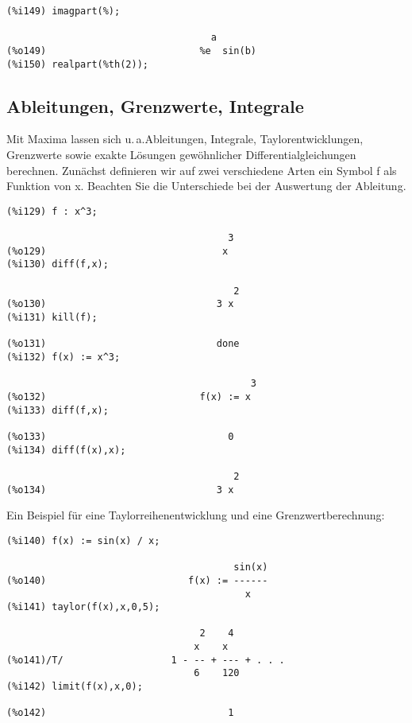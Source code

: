 \documentclass[ngerman,12pt]{scrartcl}
\newcommand*\ua{u.\,a.\xspace}
\begin{document}
\begin{verbatim}
(%i149) imagpart(%);

                                    a
(%o149)                           %e  sin(b)
(%i150) realpart(%th(2));
\end{verbatim}

\subsection{Ableitungen, Grenzwerte, Integrale}

Mit Maxima lassen sich \ua\@ Ableitungen, Integrale,
Taylorentwicklungen, Grenzwerte sowie exakte Lösungen gewöhnlicher
Differentialgleichungen berechnen.
Zunächst definieren wir auf zwei verschiedene Arten ein Symbol f als
Funktion von x. Beachten Sie die Unterschiede bei der Auswertung der
Ableitung.

\begin{verbatim}
(%i129) f : x^3;

                                       3
(%o129)                               x
(%i130) diff(f,x);

                                        2
(%o130)                              3 x
(%i131) kill(f);

(%o131)                              done
(%i132) f(x) := x^3;

                                           3
(%o132)                           f(x) := x
(%i133) diff(f,x);

(%o133)                                0
(%i134) diff(f(x),x);

                                        2
(%o134)                              3 x
\end{verbatim}

Ein Beispiel für eine Taylorreihenentwicklung und eine Grenzwertberechnung:

\begin{verbatim}
(%i140) f(x) := sin(x) / x;

                                        sin(x)
(%o140)                         f(x) := ------
                                          x
(%i141) taylor(f(x),x,0,5);

                                  2    4
                                 x    x
(%o141)/T/                   1 - -- + --- + . . .
                                 6    120
(%i142) limit(f(x),x,0);

(%o142)                                1
\end{verbatim}
\end{document}
